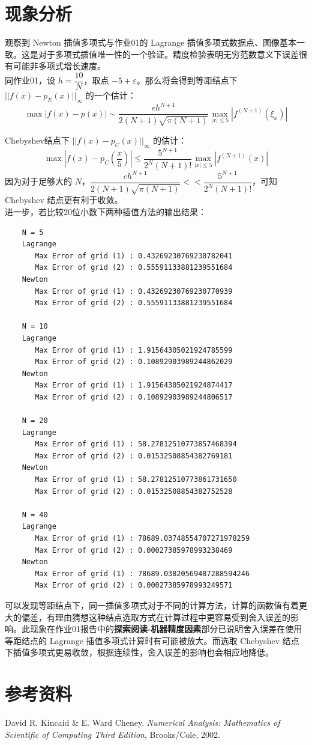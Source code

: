 \documentclass{ctexart}
\begin{document}
\section*{现象分析}
	观察到 Newton 插值多项式与作业01的 Lagrange 插值多项式数据点、图像基本一致。这是对于多项式插值唯一性的一个验证。精度检验表明无穷范数意义下误差很有可能非多项式增长速度。\\[2mm]	
	\indent 同作业01，设 $h = \dfrac{10}{N}$，取点 $-5 + \varepsilon$。那么将会得到等距结点下 $||f(x) - p_E(x)||_\infty$ 的一个估计：
	\begin{equation}
		\max{|f(x) - p(x)|} \sim \dfrac{eh^{N+1}}{2(N+1)\sqrt{\pi(N+1)}} \max\limits_{|x| \leqslant 5}{|f^{(N+1)}(\xi_x)|}
	\end{equation}
	
	Chebyshev结点下 $||f(x) - p_C(x)||_\infty$ 的估计：
	\begin{equation}
		\max{|f(x) - p_C(\frac{x}{5})|} \leqslant \dfrac{5^{N+1}}{2^N(N+1)!}\max\limits_{|x| \leqslant 5}|f^{(N+1)}(x)|
	\end{equation}
	因为对于足够大的 $N$，$\dfrac{eh^{N+1}}{2(N+1)\sqrt{\pi(N+1)}} << \dfrac{5^{N+1}}{2^N(N+1)!}$，可知 Chebyshev 结点更有利于收敛。\\
	
	进一步，若比较20位小数下两种插值方法的输出结果：
\begin{verbatim}
	N = 5
	Lagrange
	   Max Error of grid (1) : 0.43269230769230782041
	   Max Error of grid (2) : 0.55591133881239551684
	Newton
	   Max Error of grid (1) : 0.43269230769230770939
	   Max Error of grid (2) : 0.55591133881239551684
	
	N = 10
	Lagrange
	   Max Error of grid (1) : 1.91564305021924785599
	   Max Error of grid (2) : 0.10892903989244862029
	Newton
	   Max Error of grid (1) : 1.91564305021924874417
	   Max Error of grid (2) : 0.10892903989244806517
	
	N = 20
	Lagrange
	   Max Error of grid (1) : 58.27812510773857468394
	   Max Error of grid (2) : 0.01532508854382769181
	Newton
	   Max Error of grid (1) : 58.27812510773861731650
	   Max Error of grid (2) : 0.01532508854382752528
	
	N = 40
	Lagrange
	   Max Error of grid (1) : 78689.03748554707271978259
	   Max Error of grid (2) : 0.00027385978993238469
	Newton
	   Max Error of grid (1) : 78689.03820569487288594246
	   Max Error of grid (2) : 0.00027385978993249571
\end{verbatim}

	可以发现等距结点下，同一插值多项式对于不同的计算方法，计算的函数值有着更大的偏差，有理由猜想这种结点选取方式在计算过程中更容易受到舍入误差的影响。此现象在作业01报告中的{\bf 探索阅读-机器精度因素}部分已说明舍入误差在使用等距结点的 Lagrange 插值多项式计算时有可能被放大。而选取 Chebyshev 结点下插值多项式更易收敛，根据连续性，舍入误差的影响也会相应地降低。
	
\section*{参考资料}
	\noindent [1] David R. Kincaid \& E. Ward Cheney. {\it Numerical Analysis: Mathematics of Scientific of Computing Third Edition}, Brooks/Cole, 2002.
\end{document}

